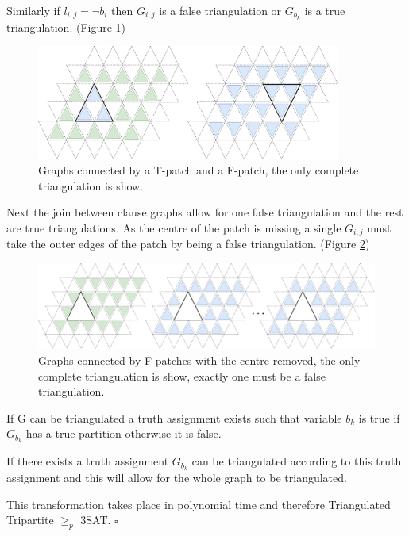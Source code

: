 \documentclass[a4paper,11pt]{report}
\begin{document}
Similarly if $l_{i,j}=\neg b_i$ then $G_{i,j}$ is a false triangulation or $G_{b_k}$ is a true triangulation. (Figure \ref{holyertwo})

\begin{figure}[h!]
\begin{center}
\includegraphics[width=100mm]{figures/lemma_two_holyer.png}
\end{center}
\caption{Graphs connected by a T-patch and a F-patch, the only complete triangulation is show.}
\label{holyertwo}
\end{figure}

Next the join between clause graphs allow for one false triangulation and the rest are true triangulations. As the centre of the patch is missing a single $G_{i,j}$ must take the outer edges of the patch by being a false triangulation. (Figure \ref{holyerthree})

\begin{figure}[h!]
\begin{center}
\includegraphics[width=120mm]{figures/lemma_three_holyer.png}
\end{center}
\caption{Graphs connected by F-patches with the centre removed, the only complete triangulation is show, exactly one must be a false triangulation.}
\label{holyerthree}
\end{figure}

If G can be triangulated a truth assignment exists such that variable $b_k$ is true if $G_{b_k}$ has a true partition otherwise it is false.

If there exists a truth assignment $G_{b_k}$ can be triangulated according to this truth assignment and this will allow for the whole graph to be triangulated.

This transformation takes place in polynomial time and therefore Triangulated Tripartite $\geq_p$ 3SAT. $\square$
\end{document}
